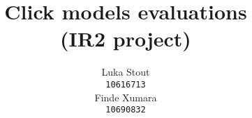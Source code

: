 \documentclass{article} %
\title{
Click models evaluations\\
\small {(IR2 project)}
}
\author{
Luka Stout\\
\texttt{10616713} \\
\And
Finde Xumara \\
\texttt{10690832} \\
}
\begin{document}
\nocite{*}
\maketitle








{}


\newpage

\end{document}
